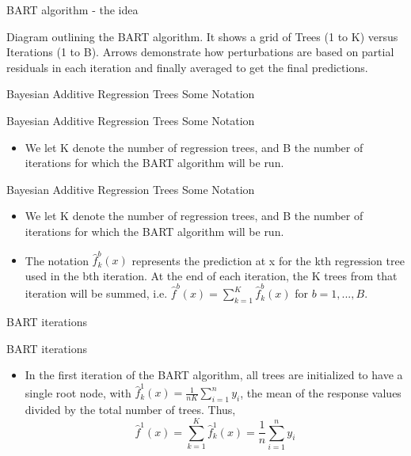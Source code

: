 \documentclass[aspectratio=169, 11pt]{beamer}
\begin{document}
\begin{frame}{BART algorithm - the idea}
\begin{tcolorbox}[colback=LightGray,title=Figure]
Diagram outlining the BART algorithm. It shows a grid of Trees (1 to K) versus Iterations (1 to B). Arrows demonstrate how perturbations are based on partial residuals in each iteration and finally averaged to get the final predictions.
\end{tcolorbox}
\end{frame}

\begin{frame}{Bayesian Additive Regression Trees Some Notation}
\end{frame}

\begin{frame}{Bayesian Additive Regression Trees Some Notation}
\begin{itemize}
    \item We let K denote the number of regression trees, and B the number of iterations for which the BART algorithm will be run.
\end{itemize}
\end{frame}

\begin{frame}{Bayesian Additive Regression Trees Some Notation}
\begin{itemize}
    \item We let K denote the number of regression trees, and B the number of iterations for which the BART algorithm will be run.
    \item The notation $\hat{f}_{k}^{b}(x)$ represents the prediction at x for the kth regression tree used in the bth iteration. At the end of each iteration, the K trees from that iteration will be summed, i.e. $\hat{f}^{b}(x)=\sum_{k=1}^{K}\hat{f}_{k}^{b}(x)$ for $b=1,...,B$.
\end{itemize}
\end{frame}

\begin{frame}{BART iterations}
\end{frame}

\begin{frame}{BART iterations}
\begin{itemize}
    \item In the first iteration of the BART algorithm, all trees are initialized to have a single root node, with $\hat{f}_{k}^{1}(x)=\frac{1}{nK}\sum_{i=1}^{n}y_{i}$, the mean of the response values divided by the total number of trees. Thus,
    \begin{equation*}
    \hat{f}^{1}(x)=\sum_{k=1}^{K}\hat{f}_{k}^{1}(x)=\frac{1}{n}\sum_{i=1}^{n}y_{i}
    \end{equation*}
\end{itemize}
\end{frame}
\end{document}
